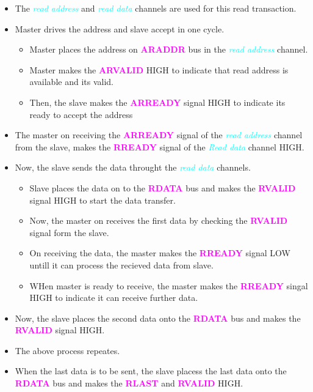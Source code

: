 \documentclass{article}
\newcommand{\chFormat}[1]{\emph{\textcolor{cyan}{#1}}}
\newcommand{\AXISignals}[1]{\textbf{\textcolor{magenta}{#1}}}
\begin{document}
\begin{itemize}
    \item The \chFormat{read address} and \chFormat{read data} channels are used for this read transaction.
    \item Master drives the address and slave accept in one cycle.
          \begin{itemize}
              \item Master places the address on \AXISignals{ARADDR} bus in the \chFormat{read address} channel.
              \item Master makes the \AXISignals{ARVALID} HIGH to indicate that read address is available and its valid.
              \item Then, the slave makes the \AXISignals{ARREADY} signal HIGH to indicate its ready to accept the address
          \end{itemize}
    \item The master on receiving the \AXISignals{ARREADY} signal of the \chFormat{read address} channel from the slave, makes the \AXISignals{RREADY} signal of the \chFormat{Read data} channel HIGH.
    \item Now, the slave sends the data throught the \chFormat{read data} channels.
          \begin{itemize}
              \item Slave places the data on to the \AXISignals{RDATA} bus and makes the \AXISignals{RVALID} signal HIGH to start the data transfer.
              \item Now, the master on receives the first data by checking the \AXISignals{RVALID} signal form the slave.
              \item On receiving the data, the master makes the \AXISignals{RREADY} signal LOW untill it can process the recieved data from slave.
              \item WHen master is ready to receive, the master makes the \AXISignals{RREADY} singal HIGH to indicate it can receive further data.
          \end{itemize}
    \item Now, the slave places the second data onto the \AXISignals{RDATA} bus and makes the \AXISignals{RVALID} signal HIGH.
    \item The above process repeates.
    \item When the last data is to be sent, the slave placess the last data onto the \AXISignals{RDATA} bus and makes the \AXISignals{RLAST} and \AXISignals{RVALID} HIGH.
\end{itemize}
\end{document}
